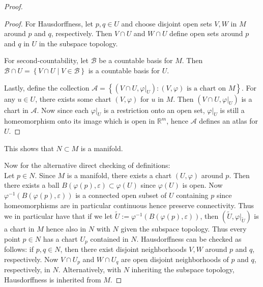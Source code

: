 \documentclass[reqno]{amsart}
\theoremstyle{definition}
\theoremstyle{remark}
\begin{document}
\begin{proof}
\begin{proof}
    For Hausdorffness, let $p,q \in U$ and choose disjoint
    open sets $V,W$ in $M$ around $p$ and $q$, respectively.
    Then $V \cap U$ and $W \cap U$ define open sets
    around $p$ and $q$ in $U$ in the subspace topology.

    For second-countability, let
    $\mathcal{B}$ be a countable basis for
    $M$. Then $\mathcal{B} \cap U
    = \left\{ V \cap U  \mid V \in  \mathcal{B} \right\} $ 
    is a countable basis for $U$.

    Lastly, define the
    collection
    $\mathcal{A} = \left\{ 
    \left( V \cap U , \varphi|_{U} \right) \colon
\left( V, \varphi  \right) \text{ is a chart on
 } M \right\} $. For any
 $u \in U$, there exists some chart
 $\left( V, \varphi  \right) $ for $u$ in
 $M$. Then $\left( V \cap U, \varphi|_{U} \right) $ 
 is a chart in $\mathcal{A}$. Now
 since each $\varphi|_{U}$ is a restriction
 onto an open set, 
 $\varphi|_{U}$ is still a homeomorphism onto
 its image which is open in 
 $\mathbb{R}^{m}$, hence
 $\mathcal{A}$ defines an atlas for $U$.
\end{proof}

This shows that $N \subset M$ is a manifold.\\
\linebreak


Now for the alternative direct checking of definitions:\\
Let $p \in N$. Since $M$ is a manifold, there
exists a chart $\left( U, \varphi  \right) $ around
$p$. Then there exists a ball
$B\left( \varphi (p), \varepsilon \right) \subset 
\varphi (U)$ since $\varphi (U)$ is open. Now
$\varphi^{-1}\left( B \left( \varphi (p),\varepsilon \right) 
\right) $ is a connected open subset of $U$ containing $p$ 
since homeomorphisms are in particular continuous hence preserve
connectivity. Thus we in particular have that
if we let $\tilde{U}:= \varphi^{-1}\left( 
B \left( \varphi (p), \varepsilon \right) \right) $, then
$\left( \tilde{U}, \varphi|_{\tilde{U}} \right) $ 
is a chart in $M$ hence also
in $N$ with $N$ given the subspace topology.
Thus every point $p \in N$ has a chart 
$U_p$ contained in $N$. Hausdorffness can be checked
as follows: if $p,q \in N$, then there
exist disjoint neighborhoods $V,W$ around $p$ and $q$, respectively.
Now  $V \cap U_p$ and $W \cap U_q$ are open disjoint neighborhoods
of $p$ and $q$, respectively, in $N$. Alternatively,
with $N$ inheriting the subspace topology, Hausdorffness
is inherited from $M$.


\end{proof}
\end{document}
